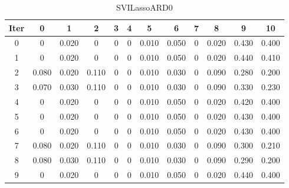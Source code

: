\begin{table}
	\begin{center}
		\begin{tabular}{|c|c|c|c|c|c|c|c|c|c|c|c|}
			\hline
			Iter & 0 & 1 & 2 & 3 & 4 & 5 & 6 & 7 & 8 & 9 & 10 \\
			\hline
			0 & 0 & 0.020 & 0 & 0 & 0 & 0.010 & 0.050 & 0 & 0.020 & 0.430 & 0.400 \\
			\hline
			1 & 0 & 0.020 & 0 & 0 & 0 & 0.010 & 0.050 & 0 & 0.020 & 0.440 & 0.410 \\
			\hline
			2 & 0.080 & 0.020 & 0.110 & 0 & 0 & 0.010 & 0.030 & 0 & 0.090 & 0.280 & 0.200 \\
			\hline
			3 & 0.070 & 0.030 & 0.110 & 0 & 0 & 0.010 & 0.030 & 0 & 0.090 & 0.330 & 0.230 \\
			\hline
			4 & 0 & 0.020 & 0 & 0 & 0 & 0.010 & 0.050 & 0 & 0.020 & 0.420 & 0.400 \\
			\hline
			5 & 0 & 0.020 & 0 & 0 & 0 & 0.010 & 0.050 & 0 & 0.020 & 0.430 & 0.400 \\
			\hline
			6 & 0 & 0.020 & 0 & 0 & 0 & 0.010 & 0.050 & 0 & 0.020 & 0.430 & 0.400 \\
			\hline
			7 & 0.080 & 0.020 & 0.110 & 0 & 0 & 0.010 & 0.030 & 0 & 0.090 & 0.300 & 0.210 \\
			\hline
			8 & 0.080 & 0.030 & 0.110 & 0 & 0 & 0.010 & 0.030 & 0 & 0.090 & 0.290 & 0.200 \\
			\hline
			9 & 0 & 0.020 & 0 & 0 & 0 & 0.010 & 0.050 & 0 & 0.020 & 0.440 & 0.400 \\
			\hline
		\end{tabular}
	\end{center}
	\caption{SVILassoARD0}
\end{table}